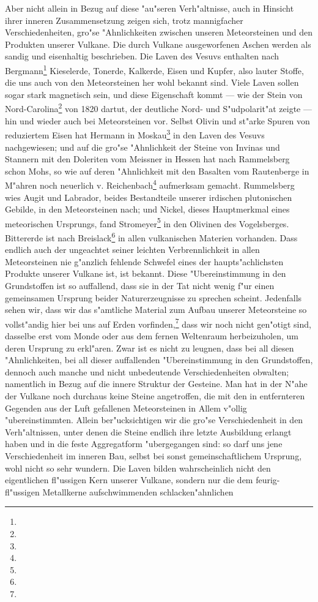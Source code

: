 \documentclass[a4paper, 8pt, oneside, polutonikogreek, german]{article}
\begin{document}
Aber nicht allein in Bezug auf diese "au"seren Verh"altnisse, auch in Hinsicht ihrer inneren Zusammensetzung zeigen sich, trotz mannigfacher Verschiedenheiten, gro"se "Ahnlichkeiten zwischen unseren Meteorsteinen und den Produkten unserer Vulkane. Die durch Vulkane ausgeworfenen Aschen werden als sandig und eisenhaltig beschrieben. Die Laven des Vesuvs enthalten nach Bergmann\footnote{} Kieselerde, Tonerde, Kalkerde, Eisen und Kupfer, also lauter Stoffe, die uns auch von den Meteorsteinen her wohl bekannt sind. Viele Laven sollen sogar stark magnetisch sein, und diese Eigenschaft kommt --- wie der Stein von Nord-Carolina\footnote{} von 1820 dartut, der deutliche Nord- und S"udpolarit"at zeigte --- hin und wieder auch bei Meteorsteinen vor. Selbst Olivin und st"arke Spuren von reduziertem Eisen hat Hermann in Moskau\footnote{} in den Laven des Vesuvs nachgewiesen; und auf die gro"se "Ahnlichkeit der Steine von Invinas und Stannern mit den Doleriten vom Meissner in Hessen hat nach Rammelsberg schon Mohs, so wie auf deren "Ahnlichkeit mit den Basalten vom Rautenberge in M"ahren noch neuerlich v. Reichenbach\footnote{} aufmerksam gemacht. Rummelsberg wies Augit und Labrador, beides Bestandteile unserer irdischen plutonischen Gebilde, in den Meteorsteinen nach; und Nickel, dieses Hauptmerkmal eines meteorischen Ursprungs, fand Stromeyer\footnote{} in den Olivinen des Vogelsberges. Bittererde ist nach Breislack\footnote{} in allen vulkanischen Materien vorhanden. Dass endlich auch der ungeachtet seiner leichten Verbrennlichkeit in allen Meteorsteinen nie g"anzlich fehlende Schwefel eines der haupts"achlichsten Produkte unserer Vulkane ist, ist bekannt. Diese "Ubereinstimmung in den Grundstoffen ist so auffallend, dass sie in der Tat nicht wenig f"ur einen gemeinsamen Ursprung beider Naturerzeugnisse zu sprechen scheint. Jedenfalls sehen wir, dass wir das s"amtliche Material zum Aufbau unserer Meteorsteine so vollst"andig hier bei uns auf Erden vorfinden,\footnote{} dass wir noch nicht gen"otigt sind, dasselbe erst vom Monde oder aus dem fernen Weltenraum herbeizuholen, um deren Ursprung zu erkl"aren. Zwar ist es nicht zu leugnen, dass bei all diesen "Ahnlichkeiten, bei all dieser auffallenden "Ubereinstimmung in den Grundstoffen, dennoch auch manche und nicht unbedeutende Verschiedenheiten obwalten; namentlich in Bezug auf die innere Struktur der Gesteine. Man hat in der N"ahe der Vulkane noch durchaus keine Steine angetroffen, die mit den in entfernteren Gegenden aus der Luft gefallenen Meteorsteinen in Allem v"ollig "ubereinstimmten. Allein ber"ucksichtigen wir die gro"se Verschiedenheit in den Verh"altnissen, unter denen die Steine endlich ihre letzte Ausbildung erlangt haben und in die feste Aggregatform "ubergegangen sind: so darf uns jene Verschiedenheit im inneren Bau, selbst bei sonst gemeinschaftlichem Ursprung, wohl nicht so sehr wundern. Die Laven bilden wahrscheinlich nicht den eigentlichen fl"ussigen Kern unserer Vulkane, sondern nur die dem feurig-fl"ussigen Metallkerne aufschwimmenden schlacken"ahnlichen 
\end{document}
